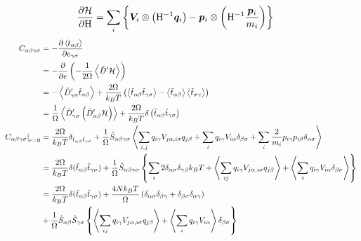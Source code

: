 \documentclass[11pt,a4paper,uplatex]{jsarticle}
\begin{document}
\begin{align}
\frac{\partial {\cal H}}{\partial {\rm H}} &= \sum_{i} \left\{ \bm{V}_{i} \otimes \left({\rm H}^{-1} \bm{q}_{i}\right)
- \bm{p}_{i} \otimes \left( {\rm H}^{-1}\frac{\bm{p}_{i}}{m_{i}}  \right) \right\}     
\end{align}
\begin{align}
    C_{\alpha \beta \gamma \sigma} &= -\frac{\partial \left< t_{\alpha \beta} \right>}{\partial e_{\gamma \sigma}}\\
    &= -\frac{\partial }{\partial e} \left( - \frac{1}{2 \Omega} \left< \hat{D}' {\cal H} \right> \right) \\
    &= -\left< \hat{D}_{\gamma \sigma}' \hat{t}_{\alpha \beta} \right> + \frac{2 \Omega}{k_{B}T} \left( 
        \left< \hat{t}_{\alpha \beta} \hat{t}_{\gamma \sigma} \right>
         - \left< \hat{t}_{\alpha \beta} \right> \left< \hat{t}_{\sigma \gamma} \right>
    \right) \\
    &= \frac{1}{\Omega} \left< \hat{D}_{\gamma \sigma}' \left( \hat{D}_{\alpha \beta}' {\cal H} \right) \right> + \frac{2\Omega}{k_{B}T} \delta  \left(\hat{t}_{\alpha \beta} \hat{t}_{\gamma \sigma}\right)\\
    \left. C_{\alpha \beta \gamma \sigma} \right|_{e=0} &= \frac{2\Omega}{k_{B} T} \delta_{\hat{t}_{\alpha \beta} \hat{t}_{\gamma \sigma}}
     + \frac{1}{\Omega} \hat{S}_{\alpha \beta \gamma \sigma} \left< 
    \sum_{i, j} q_{i \gamma} V_{j\alpha, i\sigma} q_{j \beta}
     + \sum_{i} q_{i \gamma} V_{i \alpha} \delta_{\beta \sigma}
     + \sum_{i} \frac{2}{m_{i}} p_{i \gamma} p_{i \beta} \delta_{\alpha \sigma} 
    \right> \\
    &= \frac{2\Omega}{k_{B}T} \delta(\hat{t}_{\alpha \beta} \hat{t}_{\gamma \sigma}) 
    + \frac{1}{\Omega} \hat{S}_{\alpha \beta \gamma \sigma} \left\{ 
        \sum_{i} 2\delta_{\alpha \sigma} \delta_{\gamma \beta} k_{B} T
         + \left< \sum_{ij} q_{i \gamma} V_{j \alpha, i \sigma} q_{j \beta}  \right>
         + \left< \sum_{i} q_{i \gamma} V_{i \alpha} \delta_{\beta \sigma} \right>
         \right\} \\
    &= \frac{2\Omega}{k_{B}T} \delta(\hat{t}_{\alpha \beta} \hat{t}_{\gamma \sigma})
           + \frac{4Nk_{B}T}{\Omega}\left( \delta_{\alpha \sigma} \delta_{\beta \gamma} + \delta_{\beta \sigma}\delta_{\alpha \gamma} \right) \\
    &      + \frac{1}{\Omega} \hat{S}_{\alpha \beta} \hat{S}_{\gamma \sigma}\left\{ 
           \left< \sum_{ij} q_{i \gamma} V_{j \alpha, i \sigma} q_{j \beta}  \right>
          + \left< \sum_{i} q_{i \gamma} V_{i \alpha}\right> \delta_{\beta \sigma} 
          \right\} \\
\end{align}
\end{document}
